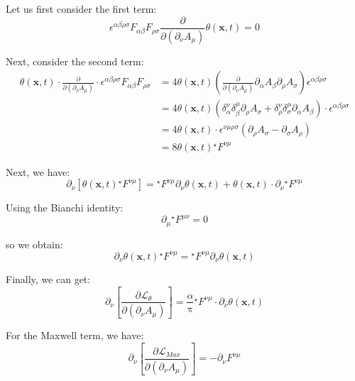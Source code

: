 Let us first consider the first term:
\begin{equation}
\epsilon^{\alpha\beta\rho\sigma} F_{\alpha\beta} F_{\rho\sigma} \frac{\partial}{\partial (\partial_\nu A_\mu)} \theta(\bm{x}, t) = 0
\end{equation}

Next, consider the second term:
\begin{equation}
\begin{aligned}
\theta(\bm{x}, t) \cdot \frac{\partial}{\partial (\partial_\nu A_\mu)} \cdot \epsilon^{\alpha\beta\rho\sigma} F_{\alpha\beta} F_{\rho\sigma} &= 4 \theta(\bm{x}, t) (\frac{\partial}{\partial (\partial_\nu A_\mu)} \partial_\alpha A_\beta \partial_\rho A_\sigma) \epsilon^{\alpha\beta\rho\sigma} \\
&= 4 \theta(\bm{x}, t) (\delta^\nu_\alpha \delta^\mu_\beta \partial_\rho A_\sigma + \delta^\nu_\rho \delta^\mu_\sigma \partial_\alpha A_\beta) \cdot \epsilon^{\alpha\beta\rho\sigma} \\
&= 4 \theta(\bm{x}, t) \cdot \epsilon^{\nu\mu\rho\sigma} (\partial_\rho A_\sigma - \partial_\sigma A_\rho) \\
&= 8 \theta(\bm{x}, t) {}^\star F^{\nu\mu}
\end{aligned}
\end{equation}

Next, we have:
\begin{equation}
\partial_\nu [\theta(\bm{x}, t) {}^\star F^{\nu\mu}] = {}^\star F^{\nu\mu} \partial_\nu \theta(\bm{x}, t) + \theta(\bm{x}, t) \cdot \partial_\nu {}^\star F^{\nu\mu}
\end{equation}

Using the Bianchi identity:
\begin{equation}
\partial_\mu {}^\star F^{\mu\nu} = 0
\end{equation}

so we obtain:
\begin{equation}
\partial_\nu \theta(\bm{x}, t) {}^\star F^{\nu\mu} = {}^\star F^{\nu\mu} \partial_\nu \theta(\bm{x}, t)
\end{equation}

Finally, we can get:
\begin{equation}
\partial_\nu [\frac{\partial \mathcal{L}_\theta}{\partial (\partial_\nu A_\mu)}] = \frac{\alpha}{\mathrm{\pi}} {}^\star F^{\nu\mu} \cdot \partial_\nu \theta(\bm{x}, t)
\end{equation}

For the Maxwell term, we have:
\begin{equation}
\partial_\nu [\frac{\partial \mathcal{L}_{Max}}{\partial (\partial_\nu A_\mu)}] = - \partial_\nu F^{\nu\mu}
\end{equation}

